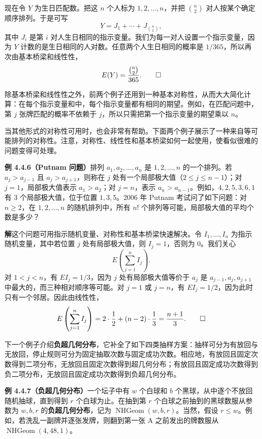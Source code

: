\documentclass[UTF8, 12pt, fontset=fandol, oneside]{ctexart}
\begin{document}
现在令 $Y$ 为生日匹配数。把这 $n$ 个人标为 $1,2,\ldots,n$，并把 $\binom{n}{2}$ 对人按某个确定顺序排列。于是可写
\[
  Y=J_1+\cdots+J_{\binom{n}{2}},
\]
其中 $J_i$ 是第 $i$ 对人生日相同的指示变量。我们为每一对人设置一个指示变量，因为 $Y$ 计数的是生日相同的人对数。任意两个人生日相同的概率是 $1/365$，所以再次由基本桥梁和线性性，
\[
  E(Y)=\frac{\binom{n}{2}}{365}. \qed
\]

除基本桥梁和线性性之外，前两个例子还用到一种基本对称性，从而大大简化计算：在每个指示变量和中，每个指示变量都有相同的期望。例如，在匹配问题中，第 $j$ 张牌匹配的概率不依赖于 $j$，所以只需把第一个指示变量的期望乘以 $n$。

当其他形式的对称性可用时，也会非常有帮助。下面两个例子展示了一种来自等可能排列的对称性。注意，对称性、线性性和基本桥梁如何一起使用，使看似很难的问题变得可处理。

\noindent\textbf{例 4.4.6（Putnam 问题）}\quad 排列 $a_1,a_2,\ldots,a_n$ 是 $1,2,\ldots,n$ 的一个排列。若 $a_j>a_{j-1}$ 且 $a_j>a_{j+1}$，则称在 $j$ 处有一个局部极大值（$2\le j\le n-1$）；对 $j=1$，局部极大值表示 $a_1>a_2$；对 $j=n$，表示 $a_n>a_{n-1}$。例如，$4,2,5,3,6,1$ 有 $3$ 个局部极大值，位于位置 $1,3,5$。2006 年 Putnam 考试问了如下问题：对 $n\ge 2$，在 $1,2,\ldots,n$ 的随机排列中，所有 $n!$ 个排列等可能，局部极大值的平均个数是多少？

\noindent\textbf{解}\quad 这个问题可用指示随机变量、对称性和基本桥梁快速解决。令 $I_1,\ldots,I_n$ 为指示随机变量，其中若位置 $j$ 处有局部极大值，则 $I_j=1$，否则为 $0$。我们关心
\[
  E\left(\sum_{j=1}^n I_j\right).
\]
对 $1<j<n$，有 $EI_j=1/3$，因为 $j$ 处有局部极大值等价于 $a_j$ 是 $a_{j-1},a_j,a_{j+1}$ 中最大的，而三种相对顺序等可能。对 $j=1$ 或 $j=n$，有 $EI_j=1/2$，因为此时只有一个邻居。因此由线性性，
\[
  E\left(\sum_{j=1}^n I_j\right)
  =2\cdot\frac{1}{2}+(n-2)\cdot\frac{1}{3}
  =\frac{n+1}{3}. \qed
\]

下一个例子介绍\textbf{负超几何分布}，它补全了如下四类抽样方案：抽样可分为有放回与无放回，停止规则可分为固定抽取次数与固定成功次数。相应地，有放回且固定次数得到二项分布，无放回且固定次数得到超几何分布；有放回且固定成功次数得到负二项分布，无放回且固定成功次数得到负超几何分布。

\noindent\textbf{例 4.4.7（负超几何分布）}\quad 一个坛子中有 $w$ 个白球和 $b$ 个黑球，从中逐个不放回随机抽球，直到得到 $r$ 个白球为止。在抽到第 $r$ 个白球之前抽到的黑球数服从参数为 $w,b,r$ 的\textbf{负超几何分布}，记为 $\operatorname{NHGeom}(w,b,r)$。当然，假设 $r\le w$。例如，若洗乱一副牌并逐张发牌，则翻到第一张 A 之前发出的牌数服从 $\operatorname{NHGeom}(4,48,1)$。
\end{document}
